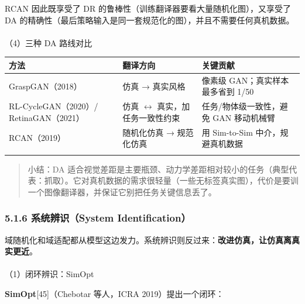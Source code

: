 \documentclass[
  chinese,
]{ctexart}
\makeatletter
\let\oldparagraph\paragraph
\renewcommand{\paragraph}{
    \@ifstar
      \xxxParagraphStar
      \xxxParagraphNoStar
  }
\newcommand{\xxxParagraphStar}[1]{\oldparagraph*{#1}\mbox{}}
\newcommand{\xxxParagraphNoStar}[1]{\oldparagraph{#1}\mbox{}}
\makeatother
\begin{document}
RCAN 因此既享受了 DR 的鲁棒性（训练翻译器要看大量随机化图），又享受了 DA
的精确性（最后策略输入是同一套规范化的图），并且不需要任何真机数据。

\paragraph{（4）三种 DA
路线对比}\label{ux4e09ux79cd-da-ux8defux7ebfux5bf9ux6bd4}

\begin{center}
\begin{tabular}{@{}>{\raggedright\arraybackslash}p{} >{\raggedright\arraybackslash}p{} >{\raggedright\arraybackslash}p{}@{}}
\toprule\noalign{}
方法 & 翻译方向 & 关键贡献 \\
\midrule\noalign{}
GraspGAN（2018） & 仿真 → 真实风格 & 像素级 GAN；真实样本最多省到 1/50 \\
RL-CycleGAN（2020）/ RetinaGAN（2021） & 仿真 \(\leftrightarrow\) 真实，加任务一致性约束 & 任务/物体级一致性，避免 GAN 移动机械臂 \\
RCAN（2019） & 随机化仿真 → 规范化仿真 & 用 Sim-to-Sim 中介，规避真机数据 \\
\bottomrule\noalign{}
\end{tabular}
\end{center}

\begin{quote}
小结：DA
适合视觉差距是主要瓶颈、动力学差距相对较小的任务（典型代表：抓取）。它对真机数据的需求很轻量（一些无标签真实图），代价是要训一个图像翻译器，并保证它别把任务关键信息丢了。
\end{quote}

\subsubsection{5.1.6 系统辨识（System
Identification）}\label{ux7cfbux7edfux8fa8ux8bc6system-identification}

域随机化和域适配都从模型这边发力。系统辨识则反过来：\textbf{改进仿真，让仿真离真实更近}。

\paragraph{（1）闭环辨识：SimOpt}\label{ux95edux73afux8fa8ux8bc6simopt}

\textbf{SimOpt}{[}45{]}（Chebotar 等人，ICRA 2019）提出一个闭环：
\end{document}
